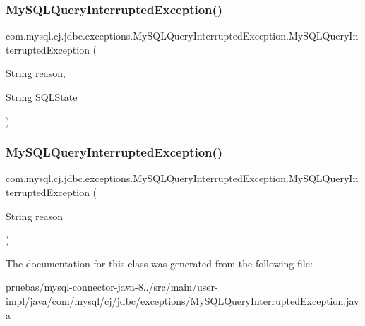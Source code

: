 \subsubsection{\texorpdfstring{My\+S\+Q\+L\+Query\+Interrupted\+Exception()}{MySQLQueryInterruptedException()}\hspace{0.1cm}{\footnotesize\ttfamily [3/4]}}
{\footnotesize\ttfamily com.\+mysql.\+cj.\+jdbc.\+exceptions.\+My\+S\+Q\+L\+Query\+Interrupted\+Exception.\+My\+S\+Q\+L\+Query\+Interrupted\+Exception (\begin{DoxyParamCaption}\item[{String}]{reason,  }\item[{String}]{S\+Q\+L\+State }\end{DoxyParamCaption})}

\mbox{\label{classcom_1_1mysql_1_1cj_1_1jdbc_1_1exceptions_1_1_my_s_q_l_query_interrupted_exception_ad105edbe581390691fb6f0a4b63ecd72}} 
\subsubsection{\texorpdfstring{My\+S\+Q\+L\+Query\+Interrupted\+Exception()}{MySQLQueryInterruptedException()}\hspace{0.1cm}{\footnotesize\ttfamily [4/4]}}
{\footnotesize\ttfamily com.\+mysql.\+cj.\+jdbc.\+exceptions.\+My\+S\+Q\+L\+Query\+Interrupted\+Exception.\+My\+S\+Q\+L\+Query\+Interrupted\+Exception (\begin{DoxyParamCaption}\item[{String}]{reason }\end{DoxyParamCaption})}



The documentation for this class was generated from the following file\+:\begin{DoxyCompactItemize}
\item 
pruebas/mysql-\/connector-\/java-\/8../src/main/user-\/impl/java/com/mysql/cj/jdbc/exceptions/\mbox{\hyperlink{_my_s_q_l_query_interrupted_exception_8java}{My\+S\+Q\+L\+Query\+Interrupted\+Exception.\+java}}\end{DoxyCompactItemize}
